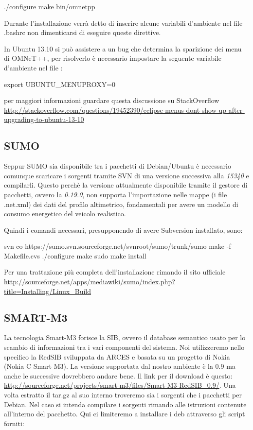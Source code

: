 \begin{bash}
./configure
make
bin/omnetpp
\end{bash}

\bigskip
\noindent
Durante l'installazione verrà detto di inserire alcune variabili d'ambiente nel file .bashrc non dimenticarsi di eseguire queste direttive.

In Ubuntu 13.10 si può assistere a un bug che determina la sparizione dei menu di OMNeT++, per risolverlo è necessario impostare la seguente variabile d'ambiente nel file  :

\begin{bash}
export UBUNTU_MENUPROXY=0
\end{bash}

\noindent
per maggiori informazioni guardare questa discussione su StackOverflow \url{http://stackoverflow.com/questions/19452390/eclipse-menus-dont-show-up-after-upgrading-to-ubuntu-13-10}

\subsection{SUMO}

Seppur SUMO sia disponibile tra i pacchetti di Debian/Ubuntu è necessario comunque scaricare i sorgenti tramite SVN di una versione successiva alla \emph{15340} e compilarli. Questo perchè la versione attualmente disponibile tramite il gestore di pacchetti, ovvero la \emph{0.19.0}, non supporta l'importazione nelle mappe (i file .net.xml) dei dati del profilo altimetrico, fondamentali per avere un modello di consumo energetico del veicolo realistico.

Quindi i comandi necessari, presupponendo di avere Subversion installato, sono:

\begin{bash}
svn co https://sumo.svn.sourceforge.net/svnroot/sumo/trunk/sumo
make -f Makefile.cvs
./configure
make
sudo make install
\end{bash}

Per una trattazione più completa dell'installazione rimando il sito ufficiale \url{http://sourceforge.net/apps/mediawiki/sumo/index.php?title=Installing/Linux_Build}

\subsection{SMART-M3}

La tecnologia Smart-M3 forisce la SIB, ovvero il database semantico usato per lo scambio di informazioni tra i vari componenti del sistema. Noi utilizzeremo nello specifico la RedSIB sviluppata da ARCES e basata su un progetto di Nokia
(Nokia C Smart M3).
La versione supportata dal nostro ambiente è la 0.9 ma anche le successive dovrebbero andare bene. Il link per il download è questo: \url{http://sourceforge.net/projects/smart-m3/files/Smart-M3-RedSIB_0.9/}. Una volta estratto il tar.gz al suo interno troveremo sia i sorgenti che i pacchetti per Debian. Nel caso si intenda compilare i sorgenti rimando alle istruzioni contenute all'interno del pacchetto. Qui ci limiteremo a installare i deb attraverso gli script forniti:

